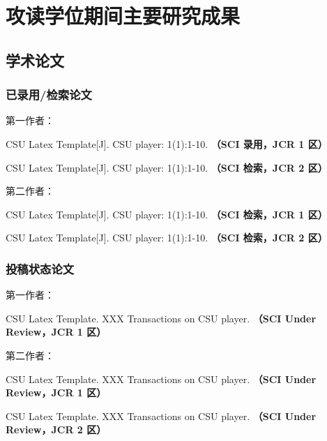 \section{攻读学位期间主要研究成果} %

\ifblindreview
\fi
\subsection*{学术论文}

\ifblindreview



\subsubsection*{已录用/检索论文}
\noindent
第一作者：
\begin{enumerate}[label={[\arabic*]}]
\item CSU Latex Template[J]. CSU player: 1(1):1-10. {\bfseries \heiti（SCI 录用，JCR 1 区）}
\item CSU Latex Template[J]. CSU player: 1(1):1-10. {\bfseries \heiti（SCI 检索，JCR 2 区）}
\end{enumerate}
第二作者：
\begin{enumerate}[label={[\arabic*]}]
\item CSU Latex Template[J]. CSU player: 1(1):1-10. {\bfseries \heiti（SCI 检索，JCR 1 区）}
\item CSU Latex Template[J]. CSU player: 1(1):1-10. {\bfseries \heiti（SCI 检索，JCR 2 区）}
\end{enumerate}
\noindent
\subsubsection*{投稿状态论文}
\noindent
第一作者：
\begin{enumerate}[label={[\arabic*]}]
\item CSU Latex Template. XXX Transactions on CSU player. {\bfseries \heiti（SCI Under Review，JCR 1 区）}
\end{enumerate}
第二作者：
\begin{enumerate}[label={[\arabic*]}]
\item CSU Latex Template. XXX Transactions on CSU player. {\bfseries \heiti（SCI Under Review，JCR 1 区）}
\item CSU Latex Template. XXX Transactions on CSU player. {\bfseries \heiti（SCI Under Review，JCR 2 区）}
\end{enumerate}


